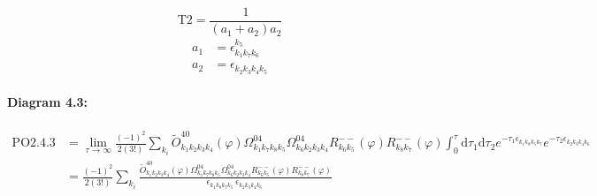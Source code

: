 \documentclass[10pt,a4paper]{article}
\begin{document}
\begin{equation}
\text{T}2 = \frac{1}{(a_1+ a_2)a_2}\end{equation}
\begin{align*}
a_1 &= \epsilon^{k_{5}}_{k_{1}k_{7}k_{6}}\\
a_2 &= \epsilon^{}_{k_{2}k_{3}k_{4}k_{5}}
\end{align*}
\paragraph{Diagram 4.3:}
\begin{align}
\text{PO}2.4.3
&= \lim\limits_{\tau \to \infty}\frac{(-1)^2 }{2(3!)}\sum_{k_i}\tilde{O}^{40}_{k_{1}k_{2}k_{3}k_{4}} (\varphi) \Omega^{04}_{k_{1}k_{7}k_{8}k_{5}} \Omega^{04}_{k_{6}k_{2}k_{3}k_{4}} R^{--}_{k_{6}k_{5}}(\varphi) R^{--}_{k_{8}k_{7}}(\varphi)\int_{0}^{\tau}\mathrm{d}\tau_1\mathrm{d}\tau_2e^{-\tau_1 \epsilon^{}_{k_{1}k_{8}k_{5}k_{7}}}e^{-\tau_2 \epsilon^{}_{k_{2}k_{3}k_{4}k_{6}}}
 \nonumber \\
&= \frac{(-1)^2 }{2(3!)}\sum_{k_i}\frac{\tilde{O}^{40}_{k_{1}k_{2}k_{3}k_{4}} (\varphi) \Omega^{04}_{k_{1}k_{7}k_{8}k_{5}} \Omega^{04}_{k_{6}k_{2}k_{3}k_{4}} R^{--}_{k_{6}k_{5}}(\varphi) R^{--}_{k_{8}k_{7}}(\varphi)}{\epsilon^{}_{k_{1}k_{8}k_{7}k_{5}}\ \epsilon^{}_{k_{2}k_{3}k_{4}k_{6}}\ } 
\end{align}
\end{document}
